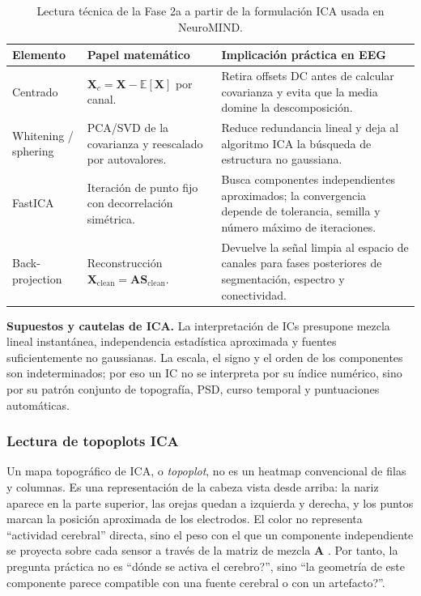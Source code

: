 \begin{table}[H]
\centering
\small
\caption{Lectura técnica de la Fase 2a a partir de la formulación ICA usada en NeuroMIND.}
\label{tab:ica-theory-operational}
\begin{tabular}{@{}p{}p{}p{}@{}}
\toprule
\textbf{Elemento} & \textbf{Papel matemático} & \textbf{Implicación práctica en EEG} \\
\midrule
Centrado & $\mathbf{X}_c=\mathbf{X}-\mathbb{E}[\mathbf{X}]$ por canal. & Retira offsets DC antes de calcular covarianza y evita que la media domine la descomposición. \\
Whitening / sphering & PCA/SVD de la covarianza y reescalado por autovalores. & Reduce redundancia lineal y deja al algoritmo ICA la búsqueda de estructura no gaussiana. \\
FastICA & Iteración de punto fijo con decorrelación simétrica. & Busca componentes independientes aproximados; la convergencia depende de tolerancia, semilla y número máximo de iteraciones. \\
Back-projection & Reconstrucción $\mathbf{X}_{\text{clean}}=\mathbf{A}\mathbf{S}_{\text{clean}}$. & Devuelve la señal limpia al espacio de canales para fases posteriores de segmentación, espectro y conectividad. \\
\bottomrule
\end{tabular}
\end{table}

\begin{controlqc}
\small
\textbf{Supuestos y cautelas de ICA.} La interpretación de ICs presupone mezcla lineal instantánea, independencia estadística aproximada y fuentes suficientemente no gaussianas. La escala, el signo y el orden de los componentes son indeterminados; por eso un IC no se interpreta por su índice numérico, sino por su patrón conjunto de topografía, PSD, curso temporal y puntuaciones automáticas.
\end{controlqc}

\subsubsection*{Lectura de topoplots ICA}

Un mapa topográfico de ICA, o \emph{topoplot}, no es un heatmap convencional de filas y columnas. Es una representación de la cabeza vista desde arriba: la nariz aparece en la parte superior, las orejas quedan a izquierda y derecha, y los puntos marcan la posición aproximada de los electrodos. El color no representa ``actividad cerebral'' directa, sino el peso con el que un componente independiente se proyecta sobre cada sensor a través de la matriz de mezcla $\mathbf{A}$ \citep{Cohen2014,Sanei2022}. Por tanto, la pregunta práctica no es ``dónde se activa el cerebro?'', sino ``la geometría de este componente parece compatible con una fuente cerebral o con un artefacto?''.

